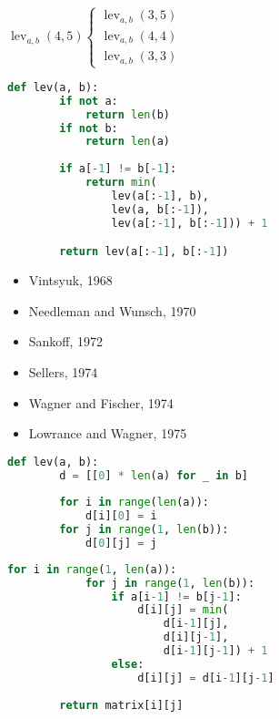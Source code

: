 \documentclass[slidestop]{beamer}
\begin{document}
  \pause
  \begin{math}
    \operatorname{lev}_{a, b}(4, 5) \begin{cases}
      \operatorname{lev}_{a, b}(3, 5) \\
      \operatorname{lev}_{a, b}(4, 4) \\
      \operatorname{lev}_{a, b}(3, 3)
    \end{cases}
  \end{math}
\begin{pframe}
\end{pframe}


\begin{pframe}
  \begin{lstlisting}[language=python]
    def lev(a, b):
        if not a:
            return len(b)
        if not b:
            return len(a)
    
        if a[-1] != b[-1]:
            return min(
                lev(a[:-1], b),
                lev(a, b[:-1]), 
                lev(a[:-1], b[:-1])) + 1

        return lev(a[:-1], b[:-1])
  \end{lstlisting}
\end{pframe}

\begin{pframe}
  \begin{itemize}
    \item Vintsyuk, 1968
    \item Needleman and Wunsch, 1970
    \item Sankoff, 1972
    \item Sellers, 1974
    \item Wagner and Fischer, 1974
    \item Lowrance and Wagner, 1975
  \end{itemize}
\end{pframe}

\begin{pframe}
  \begin{lstlisting}[language=python, caption=.]
    def lev(a, b):
        d = [[0] * len(a) for _ in b]
    
        for i in range(len(a)):
            d[i][0] = i
        for j in range(1, len(b)):
            d[0][j] = j
  \end{lstlisting}
    
  \begin{lstlisting}[language=python, caption=.]
        for i in range(1, len(a)):
            for j in range(1, len(b)):
                if a[i-1] != b[j-1]:
                    d[i][j] = min(
                        d[i-1][j],
                        d[i][j-1],
                        d[i-1][j-1]) + 1
                else:
                    d[i][j] = d[i-1][j-1]
    
        return matrix[i][j]
  \end{lstlisting}
\end{pframe}
\end{document}
